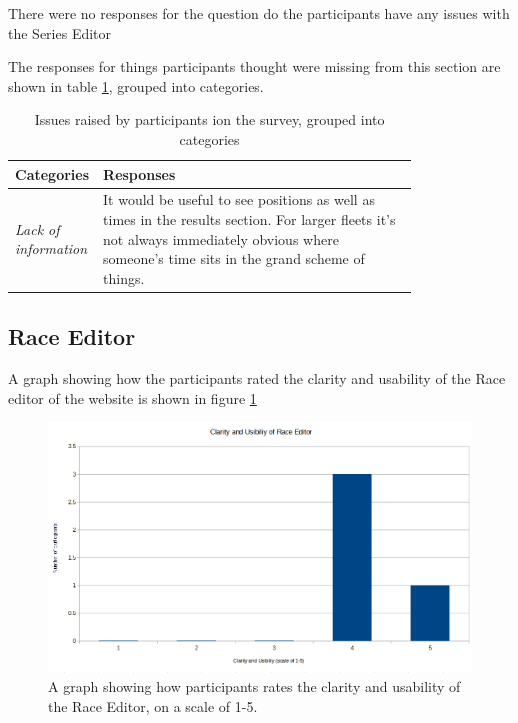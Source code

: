 \documentclass{l4proj}
\begin{document}
There were no responses for the question do the participants have any issues with the Series Editor

The responses for things participants thought were missing from this section are shown in table \ref{tab:table 2}, grouped into categories.

\begin{table}[H]
    \centering
    \caption{Issues raised by participants ion the survey, grouped into categories}
    \begin{tabular}{|l|p{0.8\linewidth}|}
    \hline
        \textbf{Categories} & \textbf{Responses}  \\ \hline
        \textit{Lack of information} & It would be useful to see positions as well as times in the results section. For larger fleets it's not always immediately obvious where someone's time sits in the grand scheme of things.  \\ \hline
    \end{tabular}
    \label{tab:table 2}
\end{table}

\subsection{Race Editor}
A graph showing how the participants rated the clarity and usability of the Race editor of the website is shown in figure \ref{fig:results3}

\begin{figure}[H]
    \centering
    \includegraphics[width=1\linewidth]{images/Results 3.png} 

    \caption{A graph showing how participants rates the clarity and usability of the Race Editor, on a scale of 1-5.
    }

    \label{fig:results3}
\end{figure}
\end{document}
